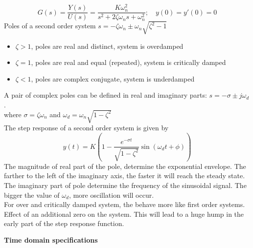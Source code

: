 \documentclass{article}
\begin{document}
\begin{enumerate}
    \[G(s) = \frac{Y(s)}{U(s)} = \frac{K \omega_n^2}{s^2 + 2 \zeta \omega_n s + \omega_n^2}; \quad y(0)=y'(0)=0\]
    Poles of a second order system $\displaystyle s = -\zeta \omega_n \pm \omega_n \sqrt{\zeta^2 -1}$
    \begin{itemize}
        \item $\zeta > 1$, poles are real and distinct, system is overdamped
        \item $\zeta = 1$, poles are real and equal (repeated), system is critically damped
        \item $\zeta < 1$, poles are complex conjugate, system is underdamped
    \end{itemize}
    A pair of complex poles can be defined in real and imaginary parts: $s = -\sigma \pm j\omega_d$. \\
    where $\sigma = \zeta \omega_n$ and $\omega_d = \omega_n \sqrt{1-\zeta^2}$ \\
    The step response of a second order system is given by
    \[y(t) = K \left( 1 - \frac{e^{-\sigma t}}{\sqrt{1 - \zeta^2}} \sin(\omega_d t + \phi) \right)\]
    The magnitude of real part of the pole, determine the exponential envelope. The farther to the left of the imaginary axis, the faster it will reach the steady state.\\
    The imaginary part of pole determine the frequency of the sinusoidal signal. The bigger the value of $\omega_d$, more oscillation will occur.\\
    For over and critically damped system, the behave more like first order systems. \\
    Effect of an additional zero on the system. This will lead to a huge hump in the early part of the step response function.    
\end{enumerate}
\textbf{Time domain specifications}
\end{document}
